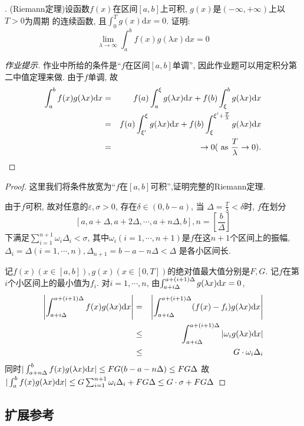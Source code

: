 \documentclass[a4paper,12pt]{article}
\begin{document}
. (Riemann定理)设函数$f(x)$在区间$[a,b]$上可积, $g(x)$是$(-\infty,+\infty)$上以$T>0$为周期
的连续函数, 且$\int_0^Tg(x)\mathrm{d}x=0$. 证明:
\[
\lim_{\lambda\to\infty}\int_a^bf(x)g(\lambda x)\mathrm{d}x=0
\]
\begin{proof}[作业提示]
  作业中所给的条件是``$f$在区间$[a,b]$单调'', 
  因此作业题可以用定积分第二中值定理来做.
  由于$f$单调, 故
  \begin{eqnarray*}
    \int_a^bf(x)g(\lambda x)\mathrm{d} x&=&f(a)\int_a^\xi g(\lambda x)\mathrm{d} x+f(b)\int_\xi^b g(\lambda x)\mathrm{d} x\\
    &=&f(a)\int_{\xi'}^\xi g(\lambda x)\mathrm{d} x+f(b)\int_{\xi}^{\xi'+\frac{T}{\lambda}}g(\lambda x)\mathrm{d} x\\
    &=&\to0 (\text{ as } \frac{T}{\lambda}\to0).
  \end{eqnarray*}
\end{proof}
\begin{proof}
  这里我们将条件放宽为``$f$在$[a,b]$可积'',证明完整的Riemann定理.

  由于$f$可积, 故对任意的$\varepsilon,\sigma>0$, 存在$\delta\in(0,b-a)$, 当
  $\Delta=\frac{T}{\lambda}<\delta$时, $f$在划分
  \[[a,a+\Delta,a+2\Delta,\cdots,a+n\Delta,b],n=[\frac{b}{\Delta}]\]
  下满足$\sum_{i=1}^{n+1}\omega_i\Delta_i<\sigma$, 
  其中$\omega_i(i=1,\cdots,n+1)$是$f$在这$n+1$个区间上的振幅, 
  $\Delta_i=\Delta(i=1,\cdots,n),\Delta_{n+1}=b-a-n\Delta<\Delta$
  是各小区间长.
  
  记$f(x)(x\in[a,b]),g(x)(x\in[0,T])$的绝对值最大值分别是$F,G$.
  记$f$在第$i$个小区间上的最小值为$f_i$.
  对$i=1,\cdots,n$, 由$\int_{a+i\Delta}^{a+(i+1)\Delta}g(\lambda x)\mathrm{d} x=0$, 
  \begin{eqnarray*}
    \left\vert\int_{a+i\Delta}^{a+(i+1)\Delta}f(x)g(\lambda x)\mathrm{d} x\right\vert&=&\left|\int_{a+i\Delta}^{a+(i+1)\Delta}(f(x)-f_i)g(\lambda x)\mathrm{d} x\right|\\
    &\leq&\int_{a+i\Delta}^{a+(i+1)\Delta}|\omega_ig(\lambda x)\mathrm{d} x|\\
    &\leq&G\cdot\omega_i\Delta_i
  \end{eqnarray*}
  同时$|\int_{a+n\Delta}^{b}f(x)g(\lambda x)\mathrm{d} x|\leq FG(b-a-n\Delta)\leq FG\Delta$
  故$|\int_a^bf(x)g(\lambda x)\mathrm{d} x|\leq G\sum_{i=1}^{n+1}\omega_i\Delta_i+FG\Delta\leq G\cdot\sigma+FG\Delta$
\end{proof}

\subsection*{扩展参考}
\end{document}
